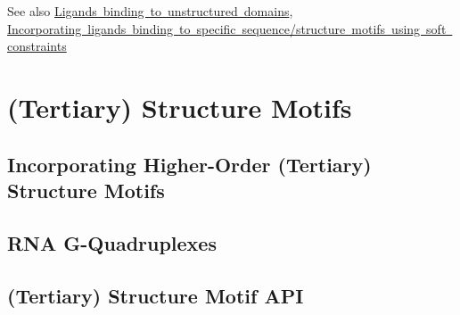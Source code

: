 \begin{DoxySeeAlso}{See also}
\mbox{\hyperlink{group__ligands__up}{Ligands binding to unstructured domains}}, \mbox{\hyperlink{group__constraints__ligand}{Incorporating ligands binding to specific sequence/structure motifs using soft constraints}}
\end{DoxySeeAlso}
 \hypertarget{structure_motifs}{}\section{(Tertiary) Structure Motifs}\label{structure_motifs}
\hypertarget{structure_motifs_structure_motifs_intro}{}\subsection{Incorporating Higher-\/\+Order (\+Tertiary) Structure Motifs}\label{structure_motifs_structure_motifs_intro}
\hypertarget{structure_motifs_structure_motif_gquad}{}\subsection{R\+N\+A G-\/\+Quadruplexes}\label{structure_motifs_structure_motif_gquad}
\hypertarget{structure_motifs_structure_motif_api}{}\subsection{(\+Tertiary) Structure Motif A\+PI}\label{structure_motifs_structure_motif_api}
 